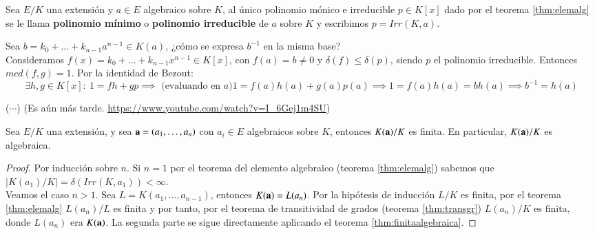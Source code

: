 \begin{dfn}
    Sea $E/K$ una extensión y $a\in E$ algebraico sobre $K$, al único polinomio mónico e irreducible $p \in K[x]$ dado por el teorema \ref{thm:elemalg} se le llama \textbf{polinomio mínimo} o \textbf{polinomio irreducible} de $a$ sobre $K$ y escribimos $p = Irr(K, a)$.
\end{dfn}

\begin{obs}
    Sea $b = k_0 + \ldots + k_{n-1} a^{n-1} \in K(a)$, ¿cómo se expresa $b^{-1}$ en la misma base?\\
    Consideramos $f(x) = k_0 + \ldots + k_{n-1}x^{n-1} \in K[x]$, con $f(a) = b \neq 0$ y $\delta(f) \leq \delta(p)$, siendo $p$ el polinomio irreducible. Entonces $mcd(f, g) = 1$. Por la identidad de Bezout:
    $$
        \exists h, g \in K[x]:\ 1 = fh + gp \implies \text{ (evaluando en $a$)} 1 = f(a)h(a) + g(a)p(a) \implies 1 = f(a)h(a) = b h(a) \implies b^{-1} = h(a)
    $$
\end{obs}

\begin{eg}
    ($\cdots$) (Es aún más tarde. \url{https://www.youtube.com/watch?v=I_6Gej1m4SU}) %
\end{eg}

\begin{thm}\label{thm:extalg} %
    Sea $E/K$ una extensión, y sea $\mathbf{a} = (a_1, \ldots, a_n)$ con $a_i \in E$ algebraicos sobre $K$, entonces $K(\mathbf{a})/K$ es finita. En particular, $K(\mathbf{a})/K$ es algebraica.
\end{thm}

\begin{proof}
    Por inducción sobre $n$. Si $n=1$ por el teorema del elemento algebraico (teorema \ref{thm:elemalg}) sabemos que $|K(a_1)/K| = \delta(Irr(K, a_1)) < \infty$.\\
    Veamos el caso $n>1$. Sea $L = K(a_1, \ldots, a_{n-1})$, entonces $K(\mathbf{a}) = L(a_n)$. Por la hipótesis de inducción $L/K$ es finita, por el teorema \ref{thm:elemalg} $L(a_n)/L$ es finita y por tanto, por el teorema de transitividad de grados (teorema \ref{thm:transgr}) $L(a_n)/K$ es finita, donde $L(a_n)$ era $K(\mathbf{a})$. La segunda parte se sigue directamente aplicando el teorema \ref{thm:finitaalgebraica}.
\end{proof}

